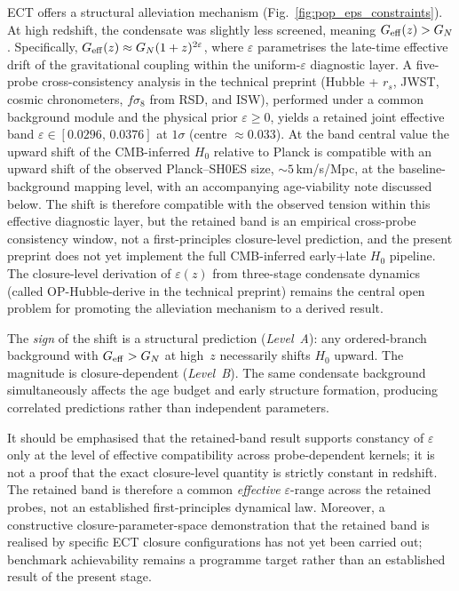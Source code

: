\documentclass[11pt,a4paper]{article}
\begin{document}
ECT offers a structural alleviation mechanism (Fig.~\ref{fig:pop_eps_constraints}). At high redshift, the condensate was slightly less screened, meaning $G_{\rm eff}(z) > G_N$. Specifically, $G_{\rm eff}(z) \approx G_N(1+z)^{2\varepsilon}$, where $\varepsilon$ parametrises the late-time effective drift of the gravitational coupling within the uniform-$\varepsilon$ diagnostic layer. A five-probe cross-consistency analysis in the technical preprint (Hubble + $r_s$, JWST, cosmic chronometers, $f\sigma_8$ from RSD, and ISW), performed under a common background module and the physical prior $\varepsilon \geq 0$, yields a retained joint effective band $\varepsilon \in [0.0296,\,0.0376]$ at $1\sigma$ (centre $\approx 0.033$). At the band central value the upward shift of the CMB-inferred $H_0$ relative to Planck is compatible with an upward shift of the observed Planck--SH0ES size, $\sim 5$\,km/s/Mpc, at the baseline-background mapping level, with an accompanying age-viability note discussed below. The shift is therefore compatible with the observed tension within this effective diagnostic layer, but the retained band is an empirical cross-probe consistency window, not a first-principles closure-level prediction, and the present preprint does not yet implement the full CMB-inferred early+late $H_0$ pipeline. The closure-level derivation of $\varepsilon(z)$ from three-stage condensate dynamics (called OP-Hubble-derive in the technical preprint) remains the central open problem for promoting the alleviation mechanism to a derived result.

The \emph{sign} of the shift is a structural prediction (\emph{Level~A}): any ordered-branch background with $G_{\rm eff} > G_N$ at high~$z$ necessarily shifts $H_0$ upward. The magnitude is closure-dependent (\emph{Level~B}). The same condensate background simultaneously affects the age budget and early structure formation, producing correlated predictions rather than independent parameters.

It should be emphasised that the retained-band result supports constancy of $\varepsilon$ only at the level of effective compatibility across probe-dependent kernels; it is not a proof that the exact closure-level quantity is strictly constant in redshift. The retained band is therefore a common \emph{effective} $\varepsilon$-range across the retained probes, not an established first-principles dynamical law. Moreover, a constructive closure-parameter-space demonstration that the retained band is realised by specific ECT closure configurations has not yet been carried out; benchmark achievability remains a programme target rather than an established result of the present stage.
\end{document}
